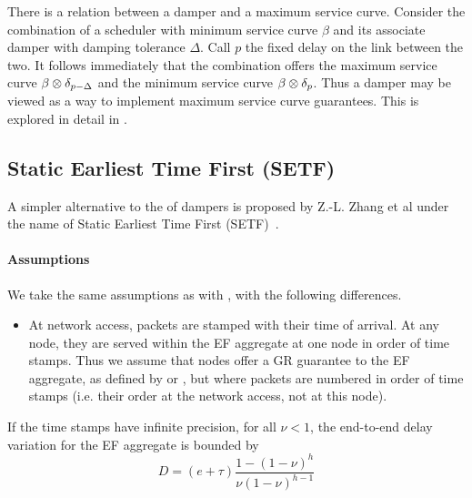 There is a relation between a damper and a maximum service curve.
Consider the combination of a scheduler with minimum service curve
$\beta$ and its associate damper with damping tolerance $\Delta$.
Call $p$ the fixed delay on the link between the two. It follows
immediately that the combination offers the maximum service curve
$\beta \otimes \delta_{p-\Delta }$ and the minimum service curve
$\beta \otimes \delta_{p}$. Thus a damper may be viewed as a way to
implement maximum service curve guarantees. This is explored in
detail in \cite{CruzSCED}.


%
%

%

\subsection{Static Earliest Time First (SETF)}


A simpler alternative to the of dampers is proposed by Z.-L. Zhang
et al under the name of Static Earliest Time First
(SETF)~\cite{zhili01}.
\paragraph{Assumptions}
We take the same assumptions as with , with
the following differences.
\begin{itemize}
  \item At network access, packets are stamped with
their time of arrival. At any node, they are served within the EF
aggregate at one node in order of time stamps. Thus we assume that
nodes offer a GR guarantee to the EF aggregate, as defined by
 or , but where packets are
numbered in order of time stamps (i.e. their order at the network
access, not at this node).
\end{itemize}
\begin{theorem}
If the time stamps have infinite precision, for all $\nu <1$, the
end-to-end delay variation for the EF aggregate is bounded by
$$
D = (e + \tau)\frac{1-(1-\nu)^{h}}{\nu (1-\nu)^{h-1}}
$$
\end{theorem}
